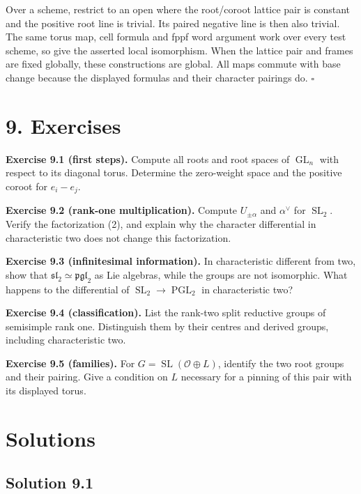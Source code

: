 \documentclass[11pt,a4paper,openany]{report}
\begin{document}
Over a scheme, restrict to an open where the root/coroot lattice pair is constant and the positive root line is trivial. Its paired negative line is then also trivial. The same torus map, cell formula and fppf word argument work over every test scheme, so give the asserted local isomorphism. When the lattice pair and frames are fixed globally, these constructions are global. All maps commute with base change because the displayed formulas and their character pairings do. \(\square\)

\section{9. Exercises}\label{AG-RG-03-exercises}

\textbf{Exercise 9.1 (first steps).} Compute all roots and root spaces of \(\operatorname{GL}_n\) with respect to its diagonal torus. Determine the zero-weight space and the positive coroot for \(e_i-e_j\).

\textbf{Exercise 9.2 (rank-one multiplication).} Compute \(U_{\pm\alpha}\) and \(\alpha^\vee\) for \(\operatorname{SL}_2\). Verify the factorization (2), and explain why the character differential in characteristic two does not change this factorization.

\textbf{Exercise 9.3 (infinitesimal information).} In characteristic different from two, show that \(\mathfrak{sl}_2\simeq\mathfrak{pgl}_2\) as Lie algebras, while the groups are not isomorphic. What happens to the differential of \(\operatorname{SL}_2\to\operatorname{PGL}_2\) in characteristic two?

\textbf{Exercise 9.4 (classification).} List the rank-two split reductive groups of semisimple rank one. Distinguish them by their centres and derived groups, including characteristic two.

\textbf{Exercise 9.5 (families).} For \(G=\operatorname{SL}(\mathcal O\oplus L)\), identify the two root groups and their pairing. Give a condition on \(L\) necessary for a pinning of this pair with its displayed torus.

\section{Solutions}\label{AG-RG-03-solutions}

\subsection{Solution 9.1}\label{AG-RG-03-solution-9.1}
\end{document}
